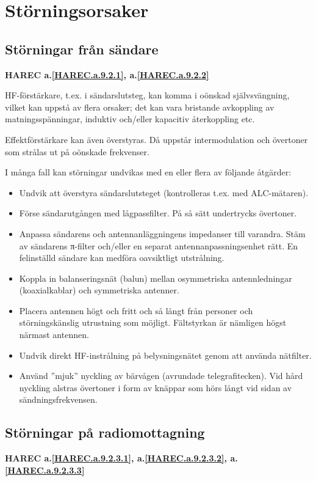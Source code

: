 \section{Störningsorsaker}

\subsection{Störningar från sändare}
\textbf{
HAREC a.\ref{HAREC.a.9.2.1}\label{myHAREC.a.9.2.1},
 a.\ref{HAREC.a.9.2.2}\label{myHAREC.a.9.2.2}
}

HF-förstärkare, t.ex. i sändarslutsteg, kan komma i oönskad självsvängning,
vilket kan uppstå av flera orsaker; det kan vara bristande avkoppling av
matningsspänningar, induktiv och/eller kapacitiv återkoppling etc.

Effektförstärkare kan även överstyras. Då uppstår intermodulation och övertoner
som strålas ut på oönskade frekvenser.

I många fall kan störningar undvikas med en eller flera av följande åtgärder:
\begin{itemize}
\item Undvik att överstyra sändarslutsteget (kontrolleras t.ex. med
  ALC-mätaren).
\item Förse sändarutgången med lågpassfilter.  På så sätt undertrycks
  övertoner.
\item Anpassa sändarens och antennanläggningens impedanser till
  varandra. Stäm av sändarens π-filter och/eller en separat
  antennanpassningsenhet rätt. En felinställd sändare kan medföra
  oavsiktligt utstrålning.
\item Koppla in balanseringsnät (balun) mellan osymmetriska
  antennledningar (koaxialkablar) och symmetriska antenner.
\item Placera antennen högt och fritt och så långt från personer och
  störningskänslig utrustning som möjligt. Fältstyrkan är nämligen
  högst närmast antennen.
\item Undvik direkt HF-instrålning på belysningsnätet genom att
  använda nätfilter.
\item Använd ''mjuk'' nyckling av bärvågen (avrundade
  telegrafitecken). Vid hård nyckling alstras övertoner i form av
  knäppar som hörs långt vid sidan av sändningsfrekvensen.
\end{itemize}

\subsection{Störningar på radiomottagning}
\textbf{
HAREC a.\ref{HAREC.a.9.2.3.1}\label{myHAREC.a.9.2.3.1},
 a.\ref{HAREC.a.9.2.3.2}\label{myHAREC.a.9.2.3.2},
 a.\ref{HAREC.a.9.2.3.3}\label{myHAREC.a.9.2.3.3}
}


